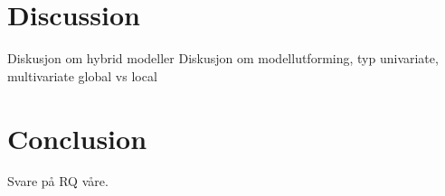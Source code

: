 \section{Discussion}
Diskusjon om hybrid modeller
Diskusjon om modellutforming, typ univariate, multivariate
global vs local

\section{Conclusion}
Svare på RQ våre.